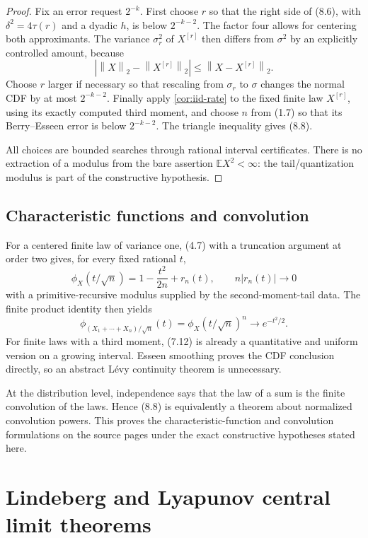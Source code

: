 \documentclass[11pt]{article}
\newcommand{\E}{\mathbb E}
\newcommand{\norm}[1]{\left\lVert#1\right\rVert}
\begin{document}
\begin{proof}
Fix an error request \(2^{-k}\).  First choose \(r\) so that the right side
of (8.6), with \(\delta^2=4\tau(r)\) and a dyadic \(h\), is below
\(2^{-k-2}\).  The factor four allows for centering both approximants.
The variance \(\sigma_r^2\) of \(X^{[r]}\) then differs from \(\sigma^2\) by
an explicitly controlled amount, because
\[
 |\norm{X}_2-\norm{X^{[r]}}_2|
 \le\norm{X-X^{[r]}}_2.                              \tag{8.9}
\]
Choose \(r\) larger if necessary so that rescaling from \(\sigma_r\) to
\(\sigma\) changes the normal CDF by at most \(2^{-k-2}\).  Finally apply
\cref{cor:iid-rate} to the fixed finite law \(X^{[r]}\), using its exactly
computed third moment, and choose \(n\) from (1.7) so that its Berry--Esseen
error is below \(2^{-k-2}\).  The triangle inequality gives (8.8).

All choices are bounded searches through rational interval certificates.
There is no extraction of a modulus from the bare assertion
\(\E X^2<\infty\): the tail/quantization modulus is part of the constructive
hypothesis.
\end{proof}

\subsection{Characteristic functions and convolution}

For a centered finite law of variance one, (4.7) with a truncation argument
at order two gives, for every fixed rational \(t\),
\[
 \phi_X(t/\sqrt n)
 =1-\frac{t^2}{2n}+r_n(t),
 \qquad n|r_n(t)|\longrightarrow0                   \tag{8.10}
\]
with a primitive-recursive modulus supplied by the second-moment-tail data.
The finite product identity then yields
\[
 \phi_{(X_1+\cdots+X_n)/\sqrt n}(t)
 =\phi_X(t/\sqrt n)^n\longrightarrow e^{-t^2/2}.     \tag{8.11}
\]
For finite laws with a third moment, (7.12) is already a quantitative and
uniform version on a growing interval.  Esseen smoothing proves the CDF
conclusion directly, so an abstract L\'evy continuity theorem is unnecessary.

At the distribution level, independence says that the law of a sum is the
finite convolution of the laws.  Hence (8.8) is equivalently a theorem about
normalized convolution powers.  This proves the characteristic-function and
convolution formulations on the source pages under the exact constructive
hypotheses stated here.

\section{Lindeberg and Lyapunov central limit theorems}
\label{sec:lindeberg}
\end{document}
